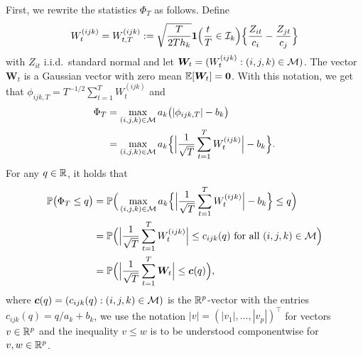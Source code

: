 \documentclass[a4paper,11pt]{article}
\numberwithin{equation}{section}
\begin{document}
First, we rewrite the statistics $\Phi_T$ as follows. Define 
\begin{equation*}
W^{(ijk)}_t = W^{(ijk)}_{t,T} := \sqrt{\frac{T}{2Th_k}} \boldsymbol{1}\Big(\frac{t}{T} \in \mathcal{I}_k\Big) \Big\{ \frac{Z_{it}}{c_i} - \frac{Z_{jt}}{c_j} \Big\}
\end{equation*}
with $Z_{it}$ i.i.d.\ standard normal and let $\boldsymbol{W}_t = (W_t^{(ijk)}: (i,j,k) \in \mathcal{M})$. The vector $\boldsymbol{W}_t$ is a Gaussian vector with zero mean $\mathbb{E}[\boldsymbol{W}_t] = \boldsymbol{0}$. With this notation, we get that $\phi_{ijk,T} = T^{-1/2} \sum_{t=1}^T W^{(ijk)}_t$ and  
\begin{align*}
\Phi_T 
 & = \max_{(i,j,k) \in \mathcal{M}} a_k \big( |\phi_{ijk,T}| - b_k \big) \\
 & = \max_{(i,j,k) \in \mathcal{M}} a_k \Big\{ \Big|\frac{1}{\sqrt{T}} \sum_{t=1}^T W^{(ijk)}_t\Big| - b_k \Big\}.
\end{align*} 
For any $q \in \mathbb{R}$, it holds that
\begin{align*}
\mathbb{P} \big( \Phi_T \le q \big) 
 & = \mathbb{P} \Big( \max_{(i,j,k) \in \mathcal{M}} a_k \Big\{ \Big|\frac{1}{\sqrt{T}} \sum_{t=1}^T W^{(ijk)}_t\Big| - b_k \Big\} \le q \Big) \\
 & = \mathbb{P} \Big( \Big|\frac{1}{\sqrt{T}} \sum_{t=1}^T W^{(ijk)}_t\Big| \le c_{ijk}(q) \text{ for all } (i,j,k) \in \mathcal{M} \Big) \\
 & = \mathbb{P} \Big( \Big|\frac{1}{\sqrt{T}} \sum_{t=1}^T \boldsymbol{W}_t\Big| \le \boldsymbol{c}(q) \Big),
\end{align*} 
where $\boldsymbol{c}(q) = (c_{ijk}(q): (i,j,k) \in \mathcal{M})$ is the $\mathbb{R}^p$-vector with the entries $c_{ijk}(q) = q/a_k + b_k$, we use the notation $|v| = (|v_1|,\ldots,|v_p|)^\top$ for vectors $v \in \mathbb{R}^p$ and the inequality $v \le w$ is to be understood componentwise for $v,w \in \mathbb{R}^p$. 
\end{document}
